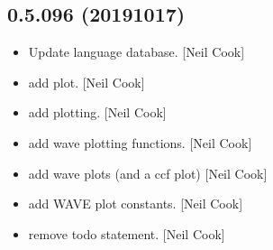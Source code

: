 \documentclass[a4paper,10pt,english]{report}
\begin{document}
\subsection{0.5.096 (2019\sphinxhyphen{}10\sphinxhyphen{}17)}
\label{\detokenize{misc/changelog:id66}}\begin{itemize}
\item {} 
Update language database. {[}Neil Cook{]}

\item {} 
 \sphinxhyphen{} add  plot. {[}Neil Cook{]}

\item {} 
 \sphinxhyphen{} add plotting. {[}Neil Cook{]}

\item {} 
 \sphinxhyphen{} add wave plotting functions. {[}Neil Cook{]}

\item {} 
 \sphinxhyphen{} add wave plots (and a
ccf plot) {[}Neil Cook{]}

\item {} 
 \sphinxhyphen{} add WAVE plot constants.
{[}Neil Cook{]}

\item {} 
 \sphinxhyphen{} remove todo statement. {[}Neil Cook{]}

\end{itemize}
\end{document}
